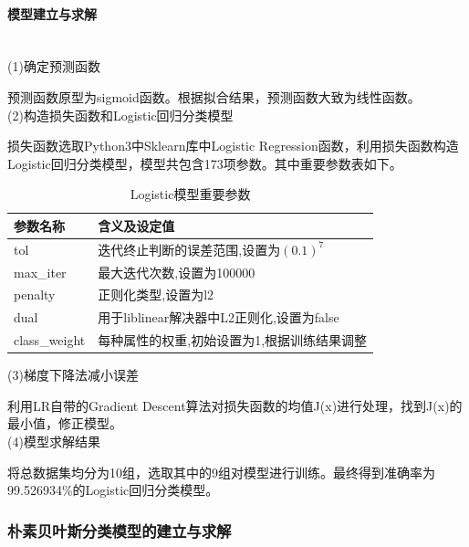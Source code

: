 \documentclass[UTF8,12pt,songti]{ctexart}
\begin{document}
\paragraph{模型建立与求解} \quad \\
(1)确定预测函数\par
预测函数原型为sigmoid函数。根据拟合结果，预测函数大致为线性函数。\\
(2)构造损失函数和Logistic回归分类模型\par
损失函数选取Python3中Sklearn库中Logistic Regression函数，利用损失函数构造Logistic回归分类模型，模型共包含173项参数。其中重要参数表如下。
\begin{table}[H]
\centering
\begin{tabular}{|p{4cm} |p{10cm}|  }%
\hline  %
参数名称&含义及设定值 \\
\hline
tol&迭代终止判断的误差范围,设置为$(0.1)^{7}$ \\
\hline
max\_iter&最大迭代次数,设置为100000 \\
\hline
penalty&正则化类型,设置为l2\\
\hline
dual&用于liblinear解决器中L2正则化,设置为false\\
\hline
class\_weight&每种属性的权重,初始设置为1,根据训练结果调整\\
\hline %
\end{tabular}
\caption{Logistic模型重要参数}
\end{table}
(3)梯度下降法减小误差\par
利用LR自带的Gradient Descent算法对损失函数的均值J(x)进行处理，找到J(x)的最小值，修正模型。\\
(4)模型求解结果\par
将总数据集均分为10组，选取其中的9组对模型进行训练。最终得到准确率为99.526934\%的Logistic回归分类模型。
\subsubsection{朴素贝叶斯分类模型的建立与求解}
\end{document}
